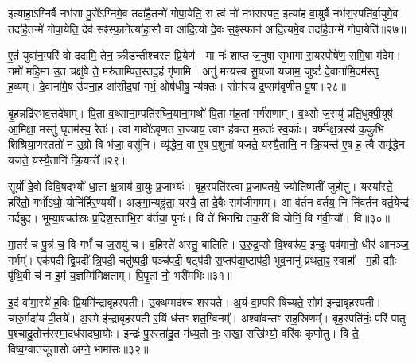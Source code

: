 इत्या॑हा॒\-ऽग्निर्वै नभ॑सा पु॒रो᳚\-ऽग्निमे॒व तदा॑है॒तन्मे॑ गोपा॒येति॒ स त्वं नो॑ नभसस्पत॒ इत्या॑ह वा॒युर्वै नभ॑स॒स्पति॑र्वा॒युमे॒व तदा॑है॒तन्मे॑ गोपा॒येति॒ देव॑ सꣴस्फा॒नेत्या॑हा॒सौ वा आ॑दि॒त्यो दे॒वः स॒ꣴ॒स्फान॑ आदि॒त्यमे॒व तदा॑है॒तन्मे॑ गोपा॒येति॑॥२७॥

{\anuvakamend[{कुसी॑द॒न्त्वन्न॑ एनमोषे॒द्यदि॑ पु॒र आ॑दि॒त्यमे॒व तदा॑है॒तन्मे॑ गोपा॒येति॑॥८॥}]}

ए॒तं युवा॑न॒म्परि॑ वो ददामि॒ तेन॒ क्रीड॑न्तीश्चरत प्रि॒येण॑। मा नः॑ शाप्त ज॒नुषा॑ सुभागा रा॒यस्पोषे॑ण॒ समि॒षा म॑देम। नमो॑ महि॒म्न उ॒त चक्षु॑षे ते॒ मरु॑ताम्पित॒स्तद॒हं गृ॑णामि। अनु॑ मन्यस्व सु॒यजा॑ यजाम॒ जुष्टं॑ दे॒वाना॑मि॒दम॑स्तु ह॒व्यम्। दे॒वाना॑मे॒ष उ॑पना॒ह आ॑सीद॒पां गर्भ॒ ओष॑धीषु॒ न्य॑क्तः। सोम॑स्य द्र॒प्सम॑वृणीत पू॒षा॥२८॥

बृ॒हन्नद्रि॑रभव॒त्तदे॑षाम्। पि॒ता व॒थ्साना॒म्पति॑रघ्नि॒याना॒मथो॑ पि॒ता म॑ह॒तां गर्ग॑राणाम्। व॒थ्सो ज॒रायु॑ प्रति॒धुक्पी॒यूष॑ आ॒मिक्षा॒ मस्तु॑ घृ॒तम॑स्य॒ रेतः॑। त्वां गावो॑\-ऽवृणत रा॒ज्याय॒ त्वाꣳ ह॑वन्त म॒रुतः॑ स्व॒र्काः। वर्ष्म॑न्क्ष॒त्रस्य॑ क॒कुभि॑ शिश्रिया॒णस्ततो॑ न उ॒ग्रो वि भ॑जा॒ वसू॑नि। व्यृ॑द्धेन॒ वा ए॒ष प॒शुना॑ यजते॒ यस्यै॒तानि॒ न क्रि॒यन्त॑ ए॒ष ह॒ त्वै समृ॑द्धेन यजते॒ यस्यै॒तानि॑ क्रि॒यन्ते᳚॥२९॥

{\anuvakamend[{पू॒षा क्रि॒यन्त॑ ए॒षो᳚\-ऽष्टौ च॑॥९॥}]}

सूर्यो॑ दे॒वो दि॑वि॒षद्भ्यो॑ धा॒ता क्ष॒त्राय॑ वा॒युः प्र॒जाभ्यः॑। बृह॒स्पति॑स्त्वा प्र॒जाप॑तये॒ ज्योति॑ष्मतीं जुहोतु। यस्या᳚स्ते॒ हरि॑तो॒ गर्भो\-ऽथो॒ योनि॑र्\mbox{}हिर॒ण्ययी᳚। अङ्गा॒न्यह्रु॑ता॒ यस्यै॒ तां दे॒वैः सम॑जीगमम्। आ व॑र्तन वर्तय॒ नि नि॑वर्तन वर्त॒येन्द्र॑ नर्दबुद। भूम्या॒श्चत॑स्रः प्र॒दिश॒स्ताभि॒रा व॑र्तया॒ पुनः॑। वि ते॑ भिनद्मि तक॒रीं वि योनिं॒ वि ग॑वी॒न्यौ᳚। वि॥३०॥

मा॒तरं॑ च पु॒त्रं च॒ वि गर्भं॑ च ज॒रायु॑ च। ब॒हिस्ते॑ अस्तु॒ बालिति॑। उ॒रु॒द्र॒प्सो वि॒श्वरू॑प॒ इन्दुः॒ पव॑मानो॒ धीर॑ आनञ्ज॒ गर्भम्᳚। एक॑पदी द्वि॒पदी᳚ त्रि॒पदी॒ चतु॑ष्पदी॒ पञ्च॑पदी॒ षट्प॑दी स॒प्तप॑द्य॒ष्टाप॑दी॒ भुव॒नानु॑ प्रथता॒ꣴ॒ स्वाहा᳚। म॒ही द्यौः पृ॑थि॒वी च॑ न इ॒मं य॒ज्ञम्मि॑मिक्षताम्। पि॒पृ॒तां नो॒ भरी॑मभिः॥३१॥

{\anuvakamend[{ग॒वी॒न्यौ॑ वि चतु॑श्चत्वारिꣳशच्च॥10॥}]}

इ॒दं वा॑मा॒स्ये॑ ह॒विः प्रि॒यमि॑न्द्राबृहस्पती। उ॒क्थम्मद॑श्च शस्यते। अ॒यं वा॒म्परि॑ षिच्यते॒ सोम॑ इन्द्राबृहस्पती। चारु॒र्मदा॑य पी॒तये᳚। अ॒स्मे इ॑न्द्राबृहस्पती र॒यिं ध॑त्तꣳ शत॒ग्विनम्᳚। अश्वा॑वन्तꣳ सह॒स्रिणम्᳚। बृह॒स्पति॑र्नः॒ परि॑ पातु प॒श्चादु॒तोत्त॑रस्मा॒दध॑रादघा॒योः। इन्द्रः॑ पु॒रस्ता॑दु॒त म॑ध्य॒तो नः॒ सखा॒ सखि॑भ्यो॒ वरि॑वः कृणोतु। वि ते॒ विष्व॒ग्वात॑जूतासो अग्ने॒ भामा॑सः॥३२॥


